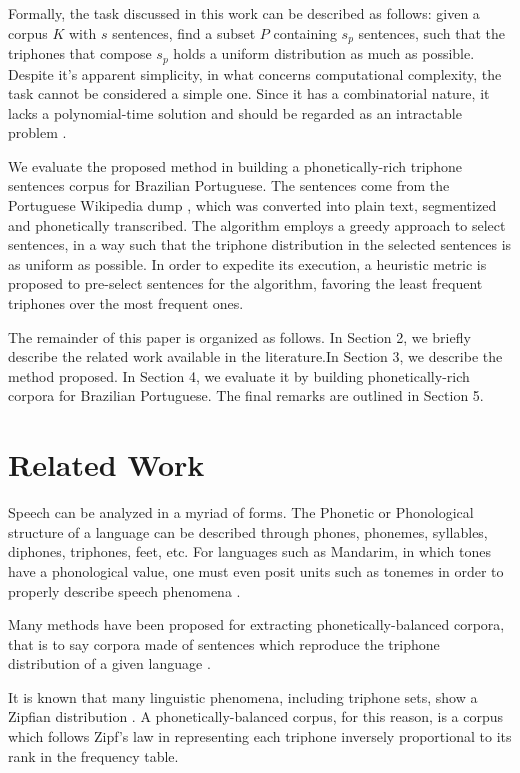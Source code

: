 Formally, the task discussed in this work can be described as follows: given a corpus $K$ with $s$ sentences,
find a subset $P$ containing $s_p$ sentences, such that the triphones that compose $s_p$ holds a 
uniform distribution as much as possible. Despite it's apparent simplicity, in what concerns computational complexity,
the task cannot be considered a simple one. Since it has a combinatorial nature, it lacks a polynomial-time
solution and should be regarded as an intractable problem \cite{Sedgewick2013}.

We evaluate the proposed method 
in building a phonetically-rich triphone sentences corpus for Brazilian Portuguese. The sentences come from the Portuguese Wikipedia dump 
\cite{Wikidump2014}, which was converted into plain text, segmentized and phonetically transcribed. The algorithm employs 
a greedy approach to select sentences, in a way such that the triphone distribution in the selected sentences is as uniform as possible. In order to expedite its execution, a heuristic metric is proposed 
to pre-select sentences for the algorithm, favoring the least frequent triphones over the most frequent ones.

The remainder of this paper is organized as follows. In Section 2, we briefly describe the related work available in the literature.In Section 3, we describe the method proposed. In Section 4, we evaluate it by building phonetically-rich corpora for Brazilian Portuguese. The final remarks are outlined in Section 5.


\section{Related Work}

Speech can be analyzed in a myriad of forms. The Phonetic or Phonological structure of a 
language can be described through phones, phonemes, syllables, diphones, triphones, feet, etc. 
For languages such as Mandarim, in which tones have a phonological value, one must even posit 
units such as tonemes in order to properly describe speech phenomena \cite{Lei2005}.

Many methods have been proposed for extracting phonetically-balanced corpora, that is to say 
corpora made of sentences which reproduce the triphone distribution of a given language 
\cite{Abushariah2012}\cite{Shen1994}\cite{Timit1993}\cite{Uraga2004}. 

It is known that many linguistic phenomena, including triphone sets, show a Zipfian distribution
 \cite{Manning1999}.
A phonetically-balanced corpus, for this reason, is a corpus which follows Zipf's law in 
representing each triphone inversely proportional to its rank in the frequency table. 

